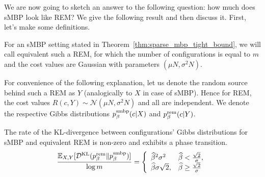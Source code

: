 We are now going to sketch an answer to the following question: how much does
sMBP look like REM? We give the following result and then discuss it. First,
let's make some definitions.

\begin{definition}
  For an sMBP setting stated in Theorem~\ref{thm:sparse_mbp_tight_bound},
  we will call equivalent such a REM, for which the number
  of configurations is equal to $m$ and the cost values are Gaussian with
  parameters $(\mu N,
  \sigma^2 N)$.
\end{definition}
For convenience of the following explanation, let us denote the random source
behind such a REM as $Y$ (analogically to $X$ in case of sMBP). Hence for REM,
the cost values $R(c, Y) \sim \mathcal{N}(\mu N, \sigma^2 N)$ and all are
independent. We denote the respective Gibbs distributions $p^{\mathrm{smbp}}_\beta(c | X)$ and
$p^{\mathrm{rem}}_\beta(c | Y)$.
\begin{theorem}\label{thm:kl_divergence}
  The rate of the KL-divergence between configurations' Gibbs distributions for sMBP 
  and equivalent REM is non-zero and exhibits a phase transition.
  \begin{equation}
    \frac{\mathbb{E}_{X, Y}[\mathcal{D}^{\text{KL}}(p^{\mathrm{rem}}_\beta \| p^{\mathrm{smbp}}_\beta)]}{\log m} = 
      \left\{ 
        \begin{array}{ll}
          \widehat\beta^2 \sigma^2 &
            \widehat \beta< \frac{\sqrt{2}}{\sigma},\\
          \widehat \beta \sigma \sqrt{2}, & 
            \widehat \beta \ge \frac{\sqrt{2}}{\sigma}
        \end{array}
      \right.
  \end{equation}
\end{theorem}

